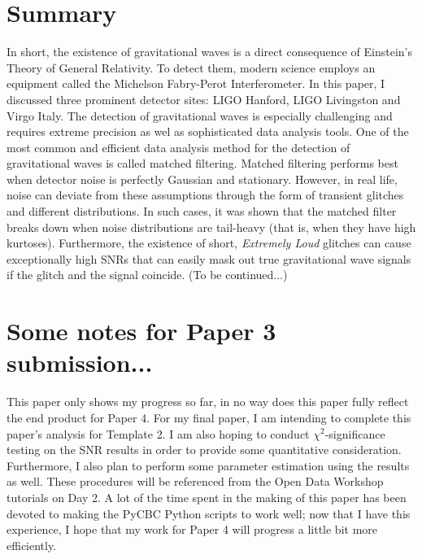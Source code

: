 \documentclass[preprint,
letterpaper,
 amsmath,amssymb,
 aps,
]{revtex4-2}
\begin{document}
\section{Summary}
In short, the existence of gravitational waves is a direct consequence of Einstein’s Theory of General Relativity. To detect them, modern science employs an equipment called the Michelson Fabry-Perot Interferometer. In this paper, I discussed three prominent detector sites: LIGO Hanford, LIGO Livingston and Virgo Italy. The detection of gravitational waves is especially challenging and requires extreme precision as wel as sophisticated data analysis tools. One of the most common and efficient data analysis method for the detection of gravitational waves is called matched filtering. Matched filtering performs best when detector noise is perfectly Gaussian and stationary. However, in real life, noise can deviate from these assumptions through the form of transient glitches and different distributions. In such cases, it was shown that the matched filter breaks down when noise distributions are tail-heavy (that is, when they have high kurtoses). Furthermore, the existence of short, \textit{Extremely Loud} glitches can cause exceptionally high SNRs that can easily mask out true gravitational wave signals if the glitch and the signal coincide. (To be continued...)

\section{Some notes for Paper 3 submission...}
This paper only shows my progress so far, in no way does this paper fully reflect the end product for Paper 4. For my final paper, I am intending to complete this paper's analysis for Template 2. I am also hoping to conduct $\chi^2$-significance testing on the SNR results in order to provide some quantitative consideration. Furthermore, I also plan to perform some parameter estimation using the results as well. These procedures will be referenced from the Open Data Workshop tutorials on Day 2. A lot of the time spent in the making of this paper has been devoted to making the PyCBC Python scripts to work well; now that I have this experience, I hope that my work for Paper 4 will progress a little bit more efficiently.
\end{document}
